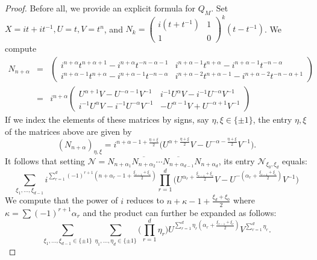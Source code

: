 \documentclass{amsart}
\newcommand{\calN}{\mathcal{N}}
\theoremstyle{definition}
\begin{document}
\begin{proof}
Before all, we provide an explicit formula for $Q_M$. Set $X=it+it^{-1},U=t,V=t^n$, and $N_k=\begin{pmatrix} i(t+t^{-1}) & 1 \\ 1 & 0 \end{pmatrix}^k(t-t^{-1})$. We compute
\begin{eqnarray*}
N_{n+\alpha}&=&\begin{pmatrix}i^{n+\alpha}t^{n+\alpha+1}-i^{n+\alpha}t^{-n-\alpha-1}& i^{n+\alpha-1}t^{n+\alpha}-i^{n+\alpha-1}t^{-n-\alpha} \\ i^{n+\alpha-1}t^{n+\alpha}-i^{n+\alpha-1}t^{-n-\alpha} & i^{n+\alpha-2}t^{n+\alpha-1} -i^{n+\alpha-2}t^{-n-\alpha+1}\end{pmatrix}\\
&=&i^{n+\alpha}\begin{pmatrix}U^{\alpha+1}V-U^{-\alpha-1}V^{-1}& i^{-1}U^{\alpha}V-i^{-1}U^{-\alpha}V^{-1}\\ i^{-1}U^{\alpha}V-i^{-1}U^{-\alpha}V^{-1}& -U^{\alpha-1}V+U^{-\alpha+1}V^{-1}\end{pmatrix}
\end{eqnarray*}
If we index the elements of these matrices by signs, say $\eta,\xi\in \{\pm 1\}$, the entry $\eta,\xi$ of the matrices above are given by 
$$ \left(N_{n+\alpha}\right)_{\eta,\xi}=i^{n+\alpha-1+\frac{\eta+\xi}{2}}\Big(U^{\alpha+\frac{\eta+\xi}{2}}V-U^{-\alpha-\frac{\eta+\xi}{2}}V^{-1}\Big).$$
It follows that setting $\calN=N_{n+\alpha_1}\overline{N_{n+\alpha_{2}}}\cdots \overline{N_{n+\alpha_{d-1}}}N_{n+\alpha_d}$, its entry $\calN_{\xi_0,\xi_d}$ equals:
$$\sum_{\xi_1,\ldots,\xi_{d-1}} i^{\sum_{r=1}^d (-1)^{r+1}(n+\alpha_r-1+\frac{\xi_{r-1}+\xi_r}{2})}\prod_{r=1}^d\Big(U^{\alpha_r+\frac{\xi_{r-1}+\xi_r}{2}}V-
U^{-(\alpha_r+\frac{\xi_{r-1}+\xi_r}{2})}V^{-1}\Big)$$
We compute that the power of $i$ reduces to $n+\kappa-1+\frac{\xi_d+\xi_0}{2}$ where $\kappa=\sum (-1)^{r+1}\alpha_r$ and the product can further be expanded as follows:
$$\sum_{\xi_1,\ldots,\xi_{d-1}\in\{\pm 1\}}\sum_{\eta_1,\ldots,\eta_d\in\{\pm1\}}\Big(\prod_{r=1}^d\eta_r\Big) U^{\sum_{r=1}^d \eta_r (\alpha_r+\frac{\xi_{r-1}+\xi_r}{2})}V^{\sum_{r=1}^d \eta_r}.$$

\end{proof}
\end{document}
